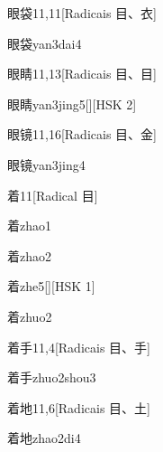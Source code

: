 \begin{entry}{眼袋}{11,11}[Radicais ⽬、⾐]
  \begin{phonetics}{眼袋}{yan3dai4}
  \end{phonetics}
\end{entry}

\begin{entry}{眼睛}{11,13}[Radicais ⽬、⽬]
  \begin{phonetics}{眼睛}{yan3jing5}[][HSK 2]
  \end{phonetics}
\end{entry}

\begin{entry}{眼镜}{11,16}[Radicais ⽬、⾦]
  \begin{phonetics}{眼镜}{yan3jing4}
  \end{phonetics}
\end{entry}

\begin{entry}{着}{11}[Radical ⽬]
  \begin{phonetics}{着}{zhao1}
  \end{phonetics}
  \begin{phonetics}{着}{zhao2}
  \end{phonetics}
  \begin{phonetics}{着}{zhe5}[][HSK 1]
  \end{phonetics}
  \begin{phonetics}{着}{zhuo2}
  \end{phonetics}
\end{entry}

\begin{entry}{着手}{11,4}[Radicais ⽬、⼿]
  \begin{phonetics}{着手}{zhuo2shou3}
  \end{phonetics}
\end{entry}

\begin{entry}{着地}{11,6}[Radicais ⽬、⼟]
  \begin{phonetics}{着地}{zhao2di4}
  \end{phonetics}
\end{entry}

